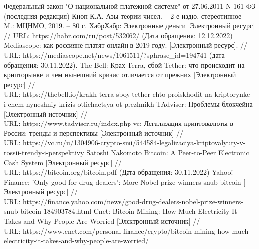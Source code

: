 \documentclass[12pt,a4paper]{article}
\begin{document}
\begin{thebibliography}{99}
		Федеральный закон "О национальной платежной системе" от 27.06.2011 N 161-ФЗ (последняя редакция)
		Кноп К.А. Азы теории чисел. -- 2-е издю, стереотипное -- M.: МЦНМО, 2019. -- 80 с.
		ХабрХабр: Электронные деньги $[$Электронный ресурс$]$ // URL: https://habr.com/ru/post/532062/ (Дата обращения: 12.12.2022)
		Mediascope: как россияне платят онлайн в 2019 году. $[$Электронный ресурс$]$. // \\URL: https://mediascope.net/news/1061511/?sphrase\_id=194741 (дата обращения: 30.11.2022). 
		The Bell: Крах Terra, сбой Tether: что происходит на крипторынке и чем нынешний кризис отличается от прежних $[$Электронный ресурс$]$ // \\URL: https://thebell.io/krakh-terra-sboy-tether-chto-proiskhodit-na-kriptorynke-i-chem-nyneshniy-krizis-otlichaetsya-ot-prezhnikh
		TAdviser: Проблемы блокчейна $[$Электронный источник$]$ // \\URL: https://www.tadviser.ru/index.php
		vc: Легализация криптовалюты в России: тренды и перспективы $[$Электронный источник$]$ // \\ URL: https://vc.ru/u/1304906-crypto-smi/544584-legalizaciya-kriptovalyuty-v-rossii-trendy-i-perspektivy
		 Satoshi Nakomoto Bitcoin: A Peer-to-Peer Electronic Cash System $[$Электронный ресурс$]$ // \\URL: https://bitcoin.org/bitcoin.pdf (Дата обращения: 30.11.2022)
		Yahoo! Finance: 'Only good for drug dealers': More Nobel prize winners snub bitcoin $[$Электронный ресурс$]$ // \\URL: https://finance.yahoo.com/news/good-drug-dealers-nobel-prize-winners-snub-bitcoin-184903784.html
		Cnet: Bitcoin Mining: How Much Electricity It Takes and Why People Are Worried $[$Электронный источник$]$ // \\ URL: https://www.cnet.com/personal-finance/crypto/bitcoin-mining-how-much-electricity-it-takes-and-why-people-are-worried/
\end{thebibliography}
\end{document}
